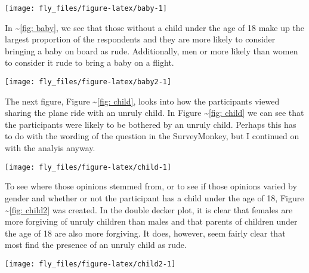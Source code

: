 \begin{Schunk}


\begin{center}\texttt{[image: fly\_files/figure-latex/baby-1]} \end{center}

\end{Schunk}

In \textasciitilde{}\ref{fig: baby}, we see that those without a child
under the age of 18 make up the largest proportion of the respondents
and they are more likely to consider bringing a baby on board as rude.
Additionally, men or more likely than women to consider it rude to bring
a baby on a flight.

\begin{Schunk}


\begin{center}\texttt{[image: fly\_files/figure-latex/baby2-1]} \end{center}

\end{Schunk}

The next figure, Figure \textasciitilde{}\ref{fig: child}, looks into
how the participants viewed sharing the plane ride with an unruly child.
In Figure \textasciitilde{}\ref{fig: child} we can see that the
participants were likely to be bothered by an unruly child. Perhaps this
has to do with the wording of the question in the SurveyMonkey, but I
continued on with the analyis anyway.

\begin{Schunk}


\begin{center}\texttt{[image: fly\_files/figure-latex/child-1]} \end{center}

\end{Schunk}

To see where those opinions stemmed from, or to see if those opinions
varied by gender and whether or not the participant has a child under
the age of 18, Figure \textasciitilde{}\ref{fig: child2} was created. In
the double decker plot, it is clear that females are more forgiving of
unruly children than males and that parents of children under the age of
18 are also more forgiving. It does, however, seem fairly clear that
most find the presence of an unruly child as rude.

\begin{Schunk}


\begin{center}\texttt{[image: fly\_files/figure-latex/child2-1]} \end{center}

\end{Schunk}

